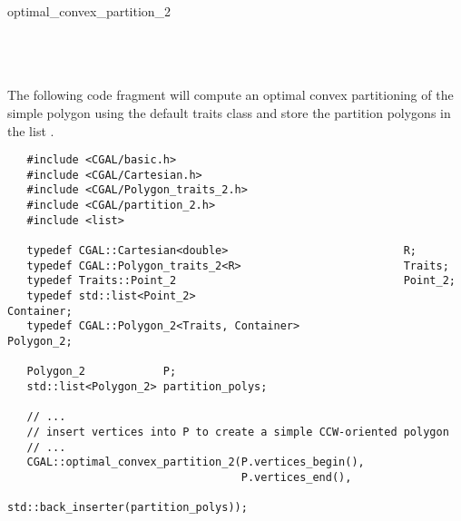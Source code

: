 \begin{ccRefFunction}{optimal_convex_partition_2}
\ccSeeAlso
{} \\
 \\
 \\
 \\


\ccExample


The following code fragment will compute an optimal
convex partitioning of the simple polygon  using the default
traits class and store the partition polygons in the list 
.

\begin{verbatim}
   #include <CGAL/basic.h>
   #include <CGAL/Cartesian.h>
   #include <CGAL/Polygon_traits_2.h>
   #include <CGAL/partition_2.h>
   #include <list>

   typedef CGAL::Cartesian<double>                           R;
   typedef CGAL::Polygon_traits_2<R>                         Traits;
   typedef Traits::Point_2                                   Point_2;
   typedef std::list<Point_2>                                Container;
   typedef CGAL::Polygon_2<Traits, Container>                Polygon_2;

   Polygon_2            P;
   std::list<Polygon_2> partition_polys;

   // ...
   // insert vertices into P to create a simple CCW-oriented polygon
   // ...
   CGAL::optimal_convex_partition_2(P.vertices_begin(),
                                    P.vertices_end(),
                                    std::back_inserter(partition_polys));
\end{verbatim}


\end{ccRefFunction}
